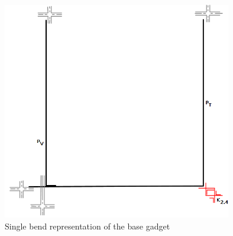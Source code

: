 \begin{figure}[htb]	
\center%
\includegraphics[width=10cm]{./img/gf2.png}
\caption{Single bend representation of the base gadget}
\label{fig:gadgetBaseSingleBend}
\end{figure}
